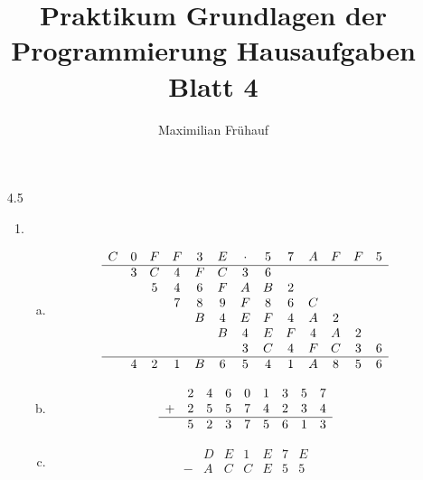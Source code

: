 \documentclass[a4paper, 10pt]{article}
\title{Praktikum Grundlagen der Programmierung Hausaufgaben Blatt 4}
\author{Maximilian Frühauf}
\begin{document}
\maketitle
\begin{enumerate}
	\item[4.5]
	      \begin{enumerate}[1.]
		      \item \begin{enumerate}[(a)]
			            \item \[
				                  \begin{array}{ ccccccccccccc }
					                  C & 0 & F & F & 3 & E & \cdot & 5 & 7 & A & F & F & 5 \\
					                  \hline
					                    & 3 & C & 4 & F & C & 3     & 6 &   &   &   &   &   \\
					                    &   & 5 & 4 & 6 & F & A     & B & 2 &   &   &   &   \\
					                    &   &   & 7 & 8 & 9 & F     & 8 & 6 & C &   &   &   \\
					                    &   &   &   & B & 4 & E     & F & 4 & A & 2 &   &   \\
					                    &   &   &   &   & B & 4     & E & F & 4 & A & 2 &   \\
					                    &   &   &   &   &   & 3     & C & 4 & F & C & 3 & 6 \\
					                  \hline
					                    & 4 & 2 & 1 & B & 6 & 5     & 4 & 1 & A & 8 & 5 & 6 \\
				                  \end{array}
			                  \]
			            \item \[
				                  \begin{array}{ccccccccc}
					                    & 2 & 4 & 6 & 0 & 1 & 3 & 5 & 7 \\
					                  + & 2 & 5 & 5 & 7 & 4 & 2 & 3 & 4 \\
					                  \hline
					                    & 5 & 2 & 3 & 7 & 5 & 6 & 1 & 3 \\
				                  \end{array}
			                  \]
			            \item \[
				                  \begin{array}{ccccccc}
					                    & D & E & 1 & E & 7 & E \\
					                  - & A & C & C & E & 5 & 5 \\

\end{array}\]
\end{enumerate}
\end{enumerate}
\end{enumerate}
\end{document}
